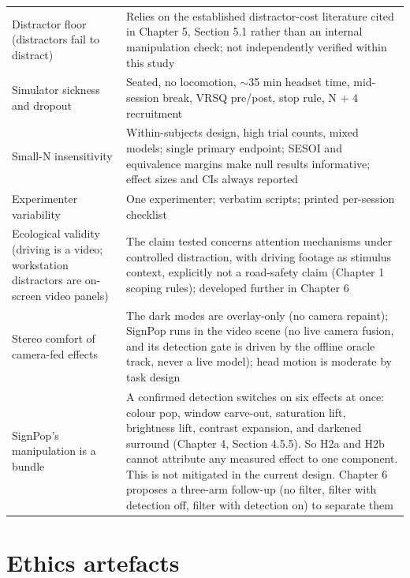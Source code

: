 \begin{longtable}{p{}|p{}}
Distractor floor (distractors fail to distract) & Relies on the established distractor-cost literature cited in Chapter 5, Section 5.1 \citep[N = 66]{ai2025} rather than an internal manipulation check; not independently verified within this study \\
Simulator sickness and dropout & Seated, no locomotion, $\sim$35 min headset time, mid-session break, VRSQ pre/post, stop rule, N + 4 recruitment \\
Small-N insensitivity & Within-subjects design, high trial counts, mixed models; single primary endpoint; SESOI and equivalence margins make null results informative; effect sizes and CIs always reported \\
Experimenter variability & One experimenter; verbatim scripts; printed per-session checklist \\
Ecological validity (driving is a video; workstation distractors are on-screen video panels) & The claim tested concerns attention mechanisms under controlled distraction, with driving footage as stimulus context, explicitly not a road-safety claim (Chapter 1 scoping rules); developed further in Chapter 6 \\
Stereo comfort of camera-fed effects & The dark modes are overlay-only (no camera repaint); SignPop runs in the video scene (no live camera fusion, and its detection gate is driven by the offline oracle track, never a live model); head motion is moderate by task design \\
SignPop's manipulation is a bundle & A confirmed detection switches on six effects at once: colour pop, window carve-out, saturation lift, brightness lift, contrast expansion, and darkened surround (Chapter 4, Section 4.5.5). So H2a and H2b cannot attribute any measured effect to one component. This is not mitigated in the current design. Chapter 6 proposes a three-arm follow-up (no filter, filter with detection off, filter with detection on) to separate them \\
\hline
\end{longtable}

\section{Ethics artefacts}
\label{sec:ethics-artefacts}

